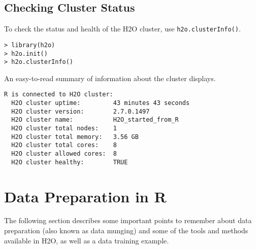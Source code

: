 \subsection{Checking Cluster Status}


To check the status and health of the H2O cluster, use {\texttt{h2o.clusterInfo()}}.
\begin{lstlisting}[style=R]
> library(h2o)
> h2o.init()
> h2o.clusterInfo()
\end{lstlisting}

An easy-to-read summary of information about the cluster displays. 
\begin{lstlisting}[style=R]
R is connected to H2O cluster:
  H2O cluster uptime:         43 minutes 43 seconds
  H2O cluster version:        2.7.0.1497
  H2O cluster name:           H2O_started_from_R
  H2O cluster total nodes:    1
  H2O cluster total memory:   3.56 GB
  H2O cluster total cores:    8
  H2O cluster allowed cores:  8
  H2O cluster healthy:        TRUE
\end{lstlisting}


\section{Data Preparation in R}

The following section describes some important points to remember about data preparation (also known as data munging) and some of the tools and methods available in H2O, as well as a data training example. 

